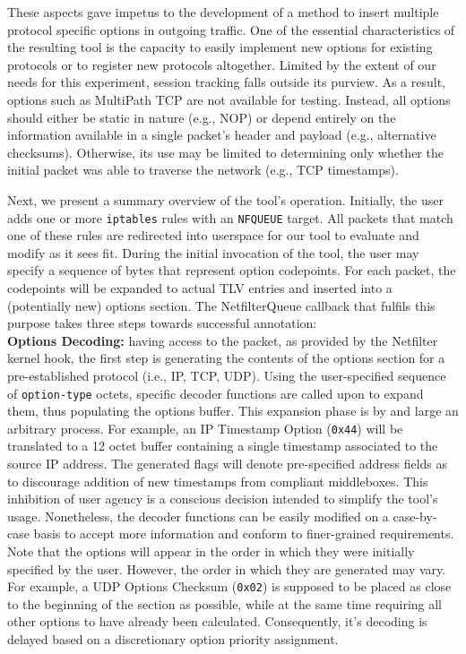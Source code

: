 These aspects gave impetus to the development of a method to insert multiple protocol specific options in outgoing traffic. One of the essential characteristics of the resulting tool is the capacity to easily implement new options for existing protocols or to register new protocols altogether. Limited by the extent of our needs for this experiment, session tracking falls outside its purview. As a result, options such as MultiPath TCP are not available for testing. Instead, all options should either be static in nature (e.g., NOP) or depend entirely on the information available in a single packet's header and payload (e.g., alternative checksums). Otherwise, its use may be limited to determining only whether the initial packet was able to traverse the network (e.g., TCP timestamps).

Next, we present a summary overview of the tool's operation. Initially, the user adds one or more \texttt{iptables} rules with an \texttt{NFQUEUE} target. All packets that match one of these rules are redirected into userspace for our tool to evaluate and modify as it sees fit. During the initial invocation of the tool, the user may specify a sequence of bytes that represent option codepoints. For each packet, the codepoints will be expanded to actual TLV entries and inserted into a (potentially new) options section. The NetfilterQueue callback that fulfils this purpose takes three steps towards successful annotation:
\\ \textbf{Options Decoding:} having access to the packet, as provided by the Netfilter kernel hook, the first step is generating the contents of the options section for a pre-established protocol (i.e., IP, TCP, UDP). Using the user-specified sequence of \texttt{option-type} octets, specific decoder functions are called upon to expand them, thus populating the options buffer. This expansion phase is by and large an arbitrary process. For example, an IP Timestamp Option (\texttt{0x44}) will be translated to a 12 octet buffer containing a single timestamp associated to the source IP address. The generated flags will denote pre-specified address fields as to discourage addition of new timestamps from compliant middleboxes. This inhibition of user agency is a conscious decision intended to simplify the tool's usage. Nonetheless, the decoder functions can be easily modified on a case-by-case basis to accept more information and conform to finer-grained requirements. Note that the options will appear in the order in which they were initially specified by the user. However, the order in which they are generated may vary. For example, a UDP Options Checksum (\texttt{0x02}) is supposed to be placed as close to the beginning of the section as possible, while at the same time requiring all other options to have already been calculated. Consequently, it's decoding is delayed based on a discretionary option priority assignment.

